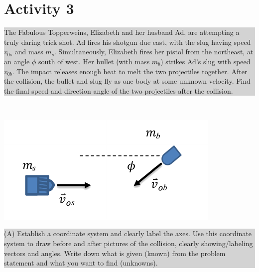 \documentclass[]{article}
\newcommand{\excerpt}[1]{\colorbox{lightgray}{\parbox{14.8cm}{#1}} \\}
\begin{document}
\section*{Activity 3}%
\excerpt{
The Fabulous Topperweins, Elizabeth and her husband Ad, are attempting a truly daring trick shot. Ad fires his shotgun due east, with the slug having speed $ v_{0s} $ and mass $ m_{s} $. Simultaneously, Elizabeth fires her pistol from the northeast, at an angle $ \phi $ south of west. Her bullet (with mass $ m_{b} $) strikes Ad's slug with speed $ v_{0b} $. The impact releases enough heat to melt the two projectiles together. After the collision, the bullet and slug fly as one body at some unknown velocity. Find the final speed and direction angle of the two projectiles after the collision.
}
\begin{center}
	\includegraphics[scale=1.2]{OverBroadway}
\end{center}
\excerpt{
(A) Establish a coordinate system and clearly label the axes. Use this coordinate system to draw before and after pictures of the collision, clearly showing/labeling vectors and angles. Write down what is given (known) from the problem statement and what you want to find (unknowns).
}
\end{document}
